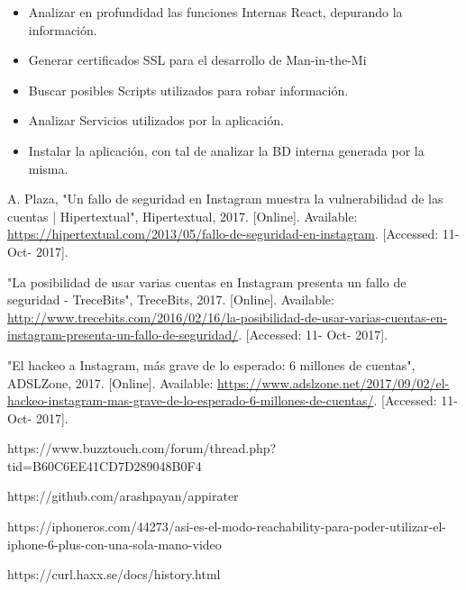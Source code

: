 \documentclass[a4paper,11pt]{article}
\theoremstyle{mytheor}
\begin{document}
\begin{itemize}
    \item Analizar en profundidad las funciones Internas React, depurando la información.
    \item Generar certificados SSL para el desarrollo de Man-in-the-Mi 
    \item Buscar posibles Scripts utilizados para robar información.
    \item Analizar Servicios utilizados por la aplicación.
    \item Instalar la aplicación, con tal de analizar la BD interna generada por la misma.
\end{itemize}



\newpage










\begin{thebibliography}{1}
A. Plaza, "Un fallo de seguridad en Instagram muestra la vulnerabilidad de las cuentas | Hipertextual", Hipertextual, 2017. [Online]. Available: \url{https://hipertextual.com/2013/05/fallo-de-seguridad-en-instagram}. [Accessed: 11- Oct- 2017].


"La posibilidad de usar varias cuentas en Instagram presenta un fallo de seguridad - TreceBits", TreceBits, 2017. [Online]. Available: \url{http://www.trecebits.com/2016/02/16/la-posibilidad-de-usar-varias-cuentas-en-instagram-presenta-un-fallo-de-seguridad/}. [Accessed: 11- Oct- 2017].

"El hackeo a Instagram, más grave de lo esperado: 6 millones de cuentas", ADSLZone, 2017. [Online]. Available: \url{https://www.adslzone.net/2017/09/02/el-hackeo-instagram-mas-grave-de-lo-esperado-6-millones-de-cuentas/}. [Accessed: 11- Oct- 2017].

https://www.buzztouch.com/forum/thread.php?tid=B60C6EE41CD7D289048B0F4

https://github.com/arashpayan/appirater

https://iphoneros.com/44273/asi-es-el-modo-reachability-para-poder-utilizar-el-iphone-6-plus-con-una-sola-mano-video

https://curl.haxx.se/docs/history.html

\end{thebibliography}

\newpage
\end{document}
